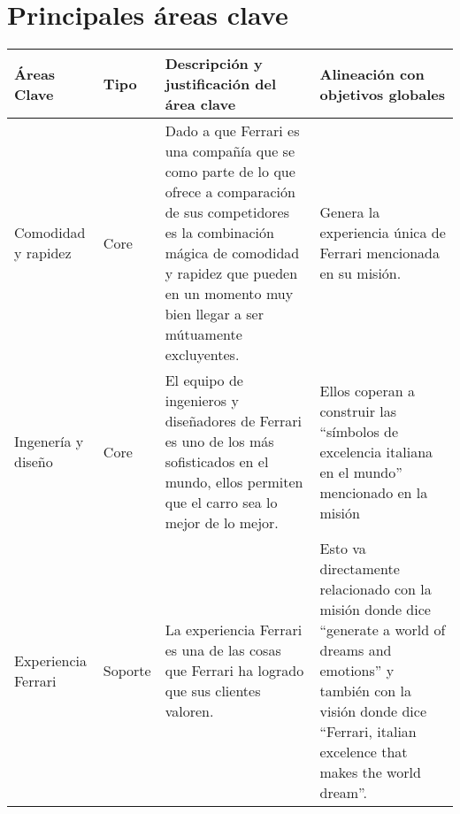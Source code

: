 \documentclass{article}
\begin{document}
\section{Principales áreas clave}
\begin{center}
    \begin{tabular}{ |p{3cm}|p{1cm}|p{6cm}|p{6cm}| }
        \hline
            Áreas Clave & Tipo & Descripción y justificación del área clave & Alineación con objetivos globales \\ 
        \hline
            Comodidad y rapidez & Core & Dado a que Ferrari es una compañía que se como parte de lo que ofrece a comparación de sus competidores es la combinación mágica de comodidad y rapidez que pueden en un momento muy bien llegar a ser mútuamente excluyentes. & Genera la experiencia única de Ferrari mencionada en su misión. 
            \\
        \hline
            Ingenería y diseño & Core & El equipo de ingenieros y diseñadores de Ferrari es uno de los más sofisticados en el mundo, ellos permiten que el carro sea lo mejor de lo mejor. & Ellos coperan a construir las ``símbolos de excelencia italiana en el mundo'' mencionado en la misión \\ 
        \hline
            Experiencia Ferrari & Soporte & La experiencia Ferrari es una de las cosas que Ferrari ha logrado que sus clientes valoren. & Esto va directamente relacionado con la misión donde dice ``generate a world of dreams and emotions'' y también con la visión donde dice ``Ferrari, italian excelence that makes the world dream''. \\ 
        \hline

        \hline
    \end{tabular}
\end{center}






\end{document}

